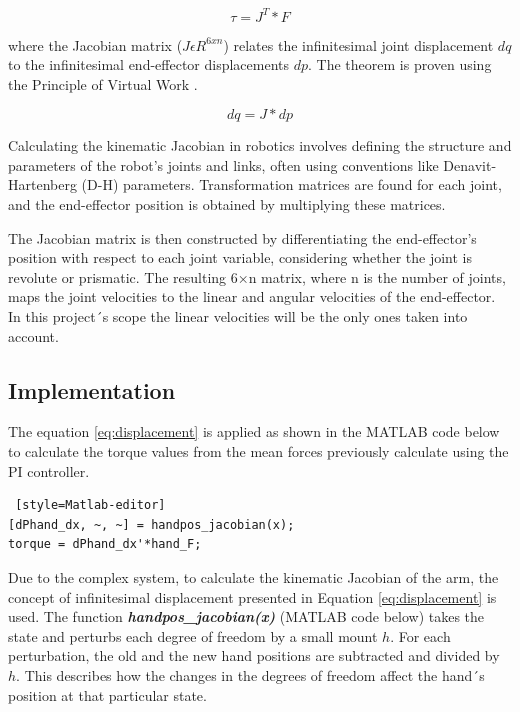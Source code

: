\begin{equation}
    \tau = J^T*F
\end{equation}

where the Jacobian matrix ($J \epsilon R^{6xn}$) relates the infinitesimal joint displacement $dq$ to the infinitesimal end-effector displacements $dp$. The theorem is proven using the Principle of Virtual Work \cite{ITR}.

\begin{equation}\label{eq:displacement}
    dq = J*dp
\end{equation} 

Calculating the kinematic Jacobian in robotics involves defining the structure and parameters of the robot's joints and links, often using conventions like Denavit-Hartenberg (D-H) parameters. Transformation matrices are found for each joint, and the end-effector position is obtained by multiplying these matrices.

The Jacobian matrix is then constructed by differentiating the end-effector's position with respect to each joint variable, considering whether the joint is revolute or prismatic. The resulting 6×n matrix, where n is the number of joints, maps the joint velocities to the linear and angular velocities of the end-effector. In this project´s scope the linear velocities will be the only ones taken into account. 

\subsection{Implementation}
The equation \ref{eq:displacement} is applied as shown in the MATLAB code below to calculate the torque values from the mean forces previously calculate using the PI controller. 

\begin{lstlisting} [style=Matlab-editor]
[dPhand_dx, ~, ~] = handpos_jacobian(x);
torque = dPhand_dx'*hand_F;
\end{lstlisting}

Due to the complex system, to calculate the kinematic Jacobian of the arm, the concept of infinitesimal displacement presented in Equation \ref{eq:displacement} is used. The function \textbf{\textit{handpos\_jacobian(x)}} (MATLAB code below) takes the state and perturbs each degree of freedom by a small mount $h$. For each perturbation, the old and the new hand positions are  subtracted and divided by $h$. This describes how the changes in the degrees of freedom affect the hand´s position at that particular state. 

